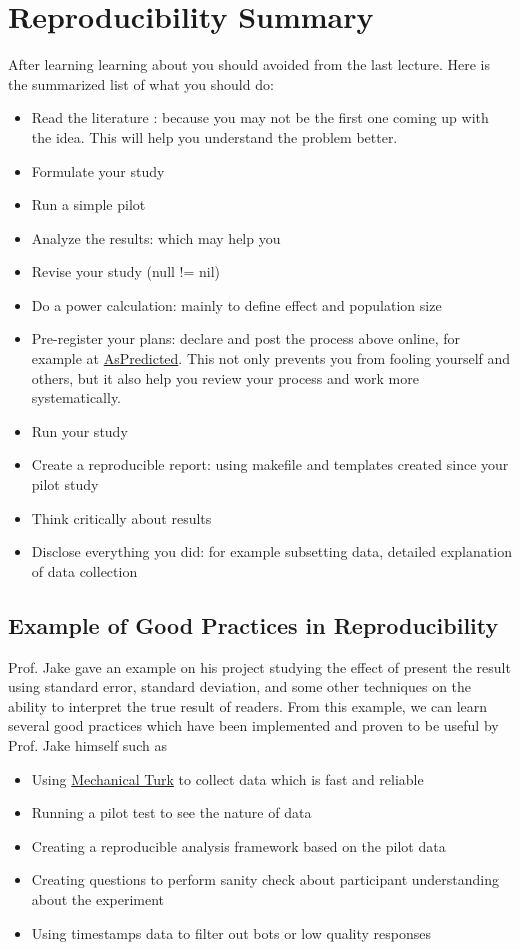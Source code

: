 
\section{Reproducibility Summary}

After learning learning about you should avoided from the last lecture. Here is the summarized list of what you should do:
\begin{itemize}
  \item Read the literature : because you may not be the first one coming up with the idea. This will help you understand the problem better.
  \item Formulate your study
  \item Run a simple pilot
  \item Analyze the results: which may help you
  \item Revise your study (null != nil)
  \item Do a power calculation: mainly to define effect and population size
  \item Pre-register your plans: declare and post the process above online, for example at \href{https://aspredicted.org/}{AsPredicted}. This not only prevents you from fooling yourself and others, but it also help you review your process and work more systematically.
  \item Run your study
  \item Create a reproducible report: using makefile and templates created since your pilot study
  \item Think critically about results
  \item Disclose everything you did: for example subsetting data, detailed explanation of data collection
\end{itemize}

\subsection{Example of  Good Practices in Reproducibility}
Prof. Jake gave an example on his project studying the effect of present the result using standard error, standard deviation, and some other techniques on the ability to interpret the true result of readers. From this example, we can learn several good practices which have been implemented and proven to be useful by Prof. Jake himself such as
\begin{itemize}
  \item Using \href{https://www.mturk.com/}{Mechanical Turk} to collect data which is fast and reliable
  \item Running a pilot test to see the nature of data
  \item Creating a reproducible analysis framework based on the pilot data
  \item Creating questions to perform sanity check about participant understanding about the experiment
  \item Using timestamps data to filter out bots or low quality responses
\end{itemize}

